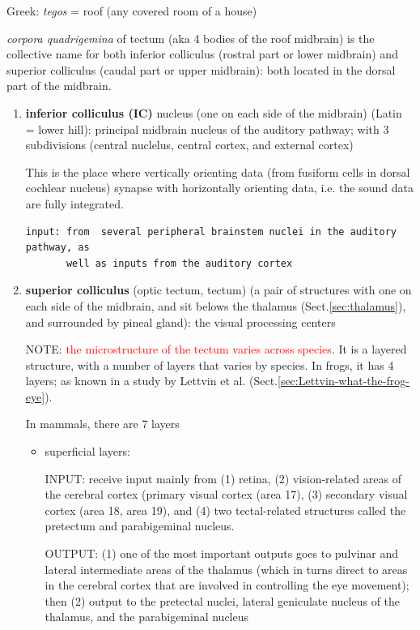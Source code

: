Greek: {\it tegos} = roof (any covered room of a house)

{\it corpora quadrigemina} of tectum (aka 4 bodies of the roof midbrain) is the
collective name for both inferior colliculus (rostral part or lower midbrain)
and superior colliculus (caudal part or upper midbrain): both located in the
dorsal part of the midbrain.


\begin{enumerate}
  
  \item {\bf inferior colliculus (IC)} nucleus (one on each side of the
  midbrain) (Latin =  lower hill):   principal midbrain nucleus of the auditory
  pathway; with 3 subdivisions (central nuclelus, central cortex, and external cortex)
  
  This is the place where vertically orienting data (from fusiform cells in
  dorsal cochlear nucleus) synapse with horizontally orienting data, i.e.
  the sound data are fully integrated.

\begin{verbatim}
input: from  several peripheral brainstem nuclei in the auditory pathway, as
       well as inputs from the auditory cortex
\end{verbatim}  

  \item {\bf superior colliculus} (optic tectum, tectum) (a pair of structures
  with one on each side of the midbrain, and sit belows the thalamus
  (Sect.\ref{sec:thalamus}), and surrounded by pineal gland):  the visual
  processing centers

NOTE: \textcolor{red}{the microstructure of the tectum varies across species}.
It is a layered structure, with a number of layers that varies by species.
In frogs, it has 4 layers; as known in a study by Lettvin et al.
(Sect.\ref{sec:Lettvin-what-the-frog-eye}).


In mammals, there are 7 layers
\begin{itemize}
  \item superficial layers: 
  
  INPUT: receive input mainly from (1) retina, (2) vision-related
  areas of the cerebral cortex (primary visual cortex (area 17), (3) secondary
  visual cortex (area 18, area 19), and (4) two tectal-related structures called
  the pretectum and parabigeminal nucleus.
  
  OUTPUT: (1) one of the most important outputs goes to  pulvinar and lateral
  intermediate areas of the thalamus (which in turns direct to areas in the
  cerebral cortex that are involved in controlling the eye movement); then
  (2) output to the pretectal nuclei, lateral geniculate nucleus of the
  thalamus, and the parabigeminal nucleus
  

\end{itemize}
\end{enumerate}
